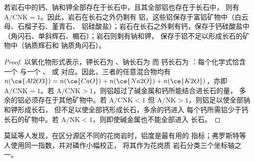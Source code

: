 \begin{proposition}[指数的含义]\label{prop:b2:crustal-melting:feldspar}
若岩石中的钙、钠和钾全部存在于长石中，且其全部铝也存在于长石中，
则有 $\mathrm{A/CNK} = 1$。因此，岩石在长石之外仍剩有
铝，这些铝保存于富铝矿物中（白云母、石榴子石、堇青石、
铝硅酸盐）；岩石在长石之外剩有钙，保存于钙硅酸盐中
（角闪石、单斜辉石、榍石）；岩石则剩有钠和钾，
保存于铝不足以形成长石的矿物中（钠质辉石和
钠质角闪石）。
\end{proposition}

\begin{proof}
以氧化物形式表示，钾长石为 、钠长石为  而
钙长石为 ：每个化学式恰含一个  与一个
、 或  对应。因此，三者的任意混合物均有 $n(\ce{Al2O3}) =
n(\ce{CaO}) + n(\ce{Na2O}) + n(\ce{K2O})$，亦即 $\mathrm{A/CNK} = 1$。若
$\mathrm{A/CNK} > 1$，则铝超过了碱金属和钙所能结合进长石的量，
多余的铝必须存在于其他矿物中。若 $\mathrm{A/CNK} < 1$ 但
$\mathrm{A/NK} > 1$，则铝足以使全部钠和钾形成长石，
但不足以使全部钙形成长石，多余的钙进入
每个钙所需铝少于钙长石的矿物中。若 $\mathrm{A/NK} < 1$，则即使碱金属也不能全部进入
长石。
\end{proof}

莫延等人发现，在区分源区不同的花岗岩时，铝度是最有用的
指标；弗罗斯特等人使用同一指数，并对磷作小幅校正，
将其作为花岗质
岩石分类三个坐标轴之一。

